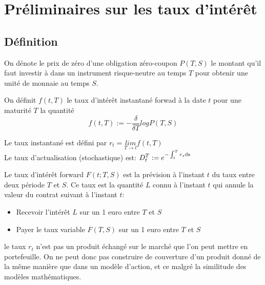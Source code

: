 

\chapter{Préliminaires sur les taux d'intérêt}

\section{Définition}
\begin{defn}
On dénote le prix de zéro d'une obligation zéro-coupon $P(T, S)$ le montant qu'il faut investir à dans un instrument risque-neutre au temps $T$ pour obtenir une unité de monnaie au temps $S$.
\end{defn}

\begin{defn}
On définit $f(t, T)$ le taux d'intérêt instantané forwad à la date $t$ pour une maturité $T$ la quantité $$f(t, T) := - \frac{ \delta}{\delta T}  log P(T, S)$$
\end{defn}

\begin{defn} Le taux instantané est défini par
  $r_t = \underset{T \to t}{lim}f(t, T) $ \\
  Le taux d'actualisation (stochastique) est: $D_t^T := e^{-\int_t^Tr_s \rm{d}s}$
\end{defn}

\iffalse
\begin{defn}
  Le taux d'intérêt cumulé entre deux période $t$ et $T$ est la quantité $R(t, T)$ que $r_t$ doit égaler pour avoir le même rendement
\end{defn}
\fi

\begin{defn}
  Le taux d'intérêt forward $F(t; T, S)$ est la prévision  à l'instant $t$ du taux entre deux période $T$ et $S$.
  Ce taux est la quantité $L$ connu à l'instant $t$ qui annule la valeur du contrat suivant à l'instant $t$:
  \begin{itemize}
  \item Recevoir l'intérêt  $L$ sur un 1 euro entre $T$ et $S$
  \item Payer le taux variable  $F(T, S)$ sur un 1 euro entre $T$ et $S$
  \end{itemize}
\end{defn}


le taux $r_t$ n’est pas un produit échangé sur le marché que l’on peut mettre en portefeuille. On ne peut donc pas construire de couverture d’un produit donné de la même manière que dans un modèle d’action, et ce malgré la similitude des modèles mathématiques.

